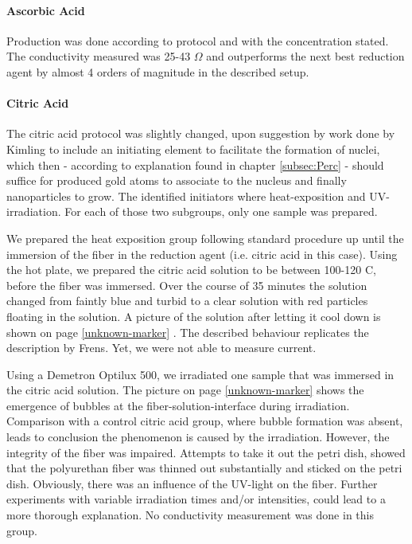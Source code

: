 \paragraph{Ascorbic Acid}
Production was done according to protocol and with the concentration stated. The conductivity measured was 25-43 $\Omega$ and outperforms the next best reduction agent by almost 4 orders of magnitude in the described setup. 


\paragraph{Citric Acid}
The citric acid protocol was slightly changed, upon suggestion by work done by Kimling \cite{Kimling} to include an initiating element to facilitate the formation of nuclei, which then - according to explanation found in chapter \ref{subsec:Perc} - should suffice for produced gold atoms to associate to the nucleus and finally nanoparticles to grow. The identified initiators where heat-exposition and UV-irradiation. For each of those two subgroups, only one sample was prepared.

We prepared the heat exposition group following standard procedure up until the immersion of the fiber in the reduction agent (i.e. citric acid in this case). Using the hot plate, we prepared the citric acid solution to be between 100-120 \degree C, before the fiber was immersed. Over the course of 35 minutes the solution changed from faintly blue and turbid to a clear solution with red particles floating in the solution. A picture of the solution after letting it cool down is shown on page \ref{unknown-marker} . The described behaviour replicates the description by Frens\cite{Frens}. Yet, we were not able to measure current.

Using a Demetron Optilux 500, we irradiated one sample that was immersed in the citric acid solution. The picture on page \ref{unknown-marker}  shows the emergence of bubbles at the fiber-solution-interface during irradiation. Comparison with a control citric acid group, where bubble formation was absent, leads to conclusion the phenomenon is caused by the irradiation. However, the integrity of the fiber was impaired. Attempts to take it out the petri dish, showed that the polyurethan fiber was thinned out substantially and sticked on the petri dish. Obviously, there was an influence of the UV-light on the fiber. Further experiments with variable irradiation times and/or intensities, could lead to a more thorough explanation. No conductivity measurement was done in this group.


